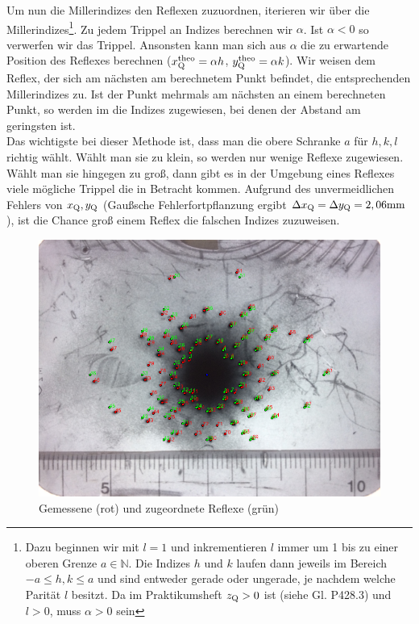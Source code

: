 Um nun die Millerindizes den Reflexen zuzuordnen, iterieren wir über die Millerindizes\footnote{Dazu beginnen wir mit $l=1$ und inkrementieren $l$ immer um 1 bis zu einer oberen Grenze $a \in \mathbb{N}$. Die Indizes $h$ und $k$ laufen dann jeweils im Bereich $-a \leq h,k \leq a$ und sind entweder gerade oder ungerade, je nachdem welche Parität $l$ besitzt. Da im  Praktikumsheft $z\ind{Q} > 0$ ist (siehe Gl. P428.3) und $l > 0$, muss $\alpha > 0$ sein}. Zu jedem Trippel an Indizes berechnen wir $\alpha$. Ist $\alpha < 0$ so verwerfen wir das Trippel. Ansonsten kann man sich aus $\alpha$ die zu erwartende Position des Reflexes berechnen ($x\ind{Q}\upd{theo} = \alpha h$, $y\ind{Q}\upd{theo} = \alpha k$). Wir weisen dem Reflex, der sich am nächsten am berechnetem Punkt befindet, die entsprechenden Millerindizes zu. Ist der Punkt mehrmals am nächsten an einem berechneten Punkt, so werden im die Indizes zugewiesen, bei denen der Abstand am geringsten ist.\\

Das wichtigste bei dieser Methode ist, dass man die obere Schranke $a$ für $h,k,l$ richtig wählt. Wählt man sie zu klein, so werden nur wenige Reflexe zugewiesen. Wählt man sie hingegen zu groß, dann gibt es in der Umgebung eines Reflexes viele mögliche Trippel die in Betracht kommen. Aufgrund des unvermeidlichen Fehlers von $x\ind{Q}, y\ind{Q}$ (Gaußsche Fehlerfortpflanzung ergibt $\Delta x\ind{Q}= \Delta y\ind{Q} = \si{2,06 \milli\meter}$), ist die Chance groß einem Reflex die falschen Indizes zuzuweisen.

\begin{figure}[h]
\centering
\includegraphics[scale=0.6]{data/laue/draw/laue.png}
\caption{Gemessene (rot) und zugeordnete Reflexe (grün)}
\label{fig:laue_calc}
\end{figure}

